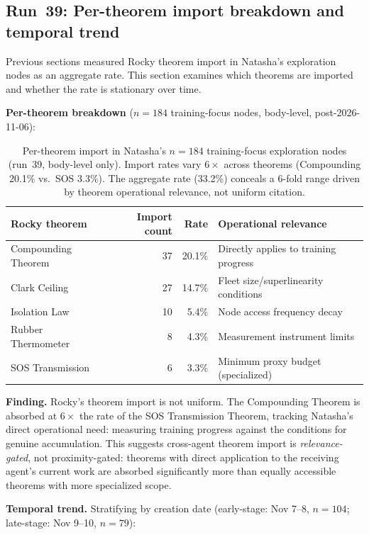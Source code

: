 \documentclass[11pt]{article}
\begin{document}
\subsection{Run~39: Per-theorem import breakdown and temporal trend}

Previous sections measured Rocky theorem import in Natasha's exploration nodes as an aggregate rate. This section examines which theorems are imported and whether the rate is stationary over time.

\textbf{Per-theorem breakdown} ($n=184$ training-focus nodes, body-level, post-2026-11-06):

\begin{table}[h]
\centering
\begin{tabular}{lrrl}
\toprule
Rocky theorem & Import count & Rate & Operational relevance \\
\midrule
Compounding Theorem & 37 & 20.1\% & Directly applies to training progress \\
Clark Ceiling & 27 & 14.7\% & Fleet size/superlinearity conditions \\
Isolation Law & 10 & 5.4\% & Node access frequency decay \\
Rubber Thermometer & 8 & 4.3\% & Measurement instrument limits \\
SOS Transmission & 6 & 3.3\% & Minimum proxy budget (specialized) \\
\bottomrule
\end{tabular}
\caption{Per-theorem import in Natasha's $n=184$ training-focus exploration nodes (run~39, body-level only). Import rates vary $6{\times}$ across theorems (Compounding 20.1\% vs.\ SOS 3.3\%). The aggregate rate (33.2\%) conceals a 6-fold range driven by theorem operational relevance, not uniform citation.}
\end{table}

\textbf{Finding.} Rocky's theorem import is not uniform. The Compounding Theorem is absorbed at $6{\times}$ the rate of the SOS Transmission Theorem, tracking Natasha's direct operational need: measuring training progress against the conditions for genuine accumulation. This suggests cross-agent theorem import is \emph{relevance-gated}, not proximity-gated: theorems with direct application to the receiving agent's current work are absorbed significantly more than equally accessible theorems with more specialized scope.

\textbf{Temporal trend.} Stratifying by creation date (early-stage: Nov 7--8, $n=104$; late-stage: Nov 9--10, $n=79$):
\end{document}
